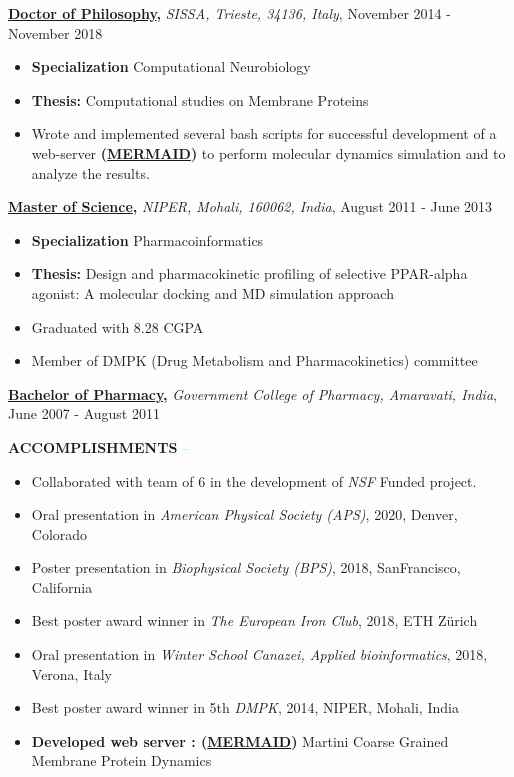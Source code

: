 \documentclass{article}
\newcommand\liner{\leavevmode\xleaders\hbox{\textcolor{cyan}{--}}\hfill\kern0pt}
\begin{document}
\normalsize{
\textbf{\underline{Doctor of Philosophy},} \emph{SISSA, Trieste, 34136, Italy}, \hfill{November 2014 - November 2018} 
\begin{itemize}
\item \textbf{Specialization} Computational Neurobiology
\item \textbf{Thesis:} Computational studies on Membrane Proteins
\item Wrote and implemented several bash scripts for successful development of a web-server \textbf{(\href{https://molsim.sci.univr.it/mangesh/index.php}{MERMAID})} to perform molecular dynamics simulation and to analyze the results.
\end{itemize}

\textbf{\underline{Master of Science},} \emph{NIPER, Mohali, 160062, India}, \hfill August 2011 - June 2013  
\begin{itemize}
\item \textbf{Specialization} Pharmacoinformatics
\item \textbf{Thesis:} Design and pharmacokinetic profiling of selective PPAR-alpha agonist: A molecular docking and MD simulation approach
\item Graduated with 8.28 CGPA
\item Member of DMPK (Drug Metabolism and Pharmacokinetics) committee
\end{itemize}

\textbf{\underline{Bachelor of Pharmacy},} \emph{Government College of Pharmacy, Amaravati, India}, \hfill{June 2007 - August 2011} 
}

\vspace{10pt}
\large{\textcolor{brey}{\textbf{ACCOMPLISHMENTS}}} \liner
\normalsize{
\begin{itemize}
  \item Collaborated with team of 6 in the development of \textit{NSF} Funded project.
  \item Oral presentation in \textit{American Physical Society (APS)}, 2020, Denver, Colorado
  \item Poster presentation in \textit{Biophysical Society (BPS)}, 2018, SanFrancisco, California
  \item Best poster award winner in \textit{The European Iron Club}, 2018, ETH Zürich
  \item Oral presentation in \textit{Winter School Canazei, Applied bioinformatics}, 2018, Verona, Italy
  \item Best poster award winner in 5th \textit{DMPK}, 2014, NIPER, Mohali, India
  \item \textbf{Developed web server : (\href{https://molsim.sci.univr.it/mangesh/index.php}{MERMAID})} Martini Coarse Grained Membrane Protein Dynamics
\end{itemize}
}
\end{document}
